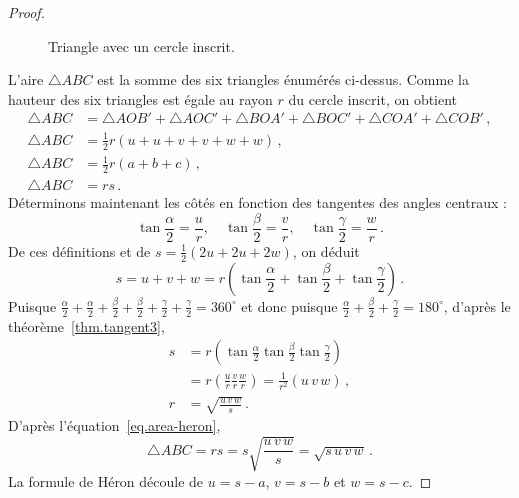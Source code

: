 \begin{proof}
\begin{figure}[ht]

\caption{Triangle avec un cercle inscrit.}\label{f.inscribed}
\end{figure}
L'aire $\triangle ABC$ est la somme des six triangles énumérés ci-dessus. Comme la hauteur des six triangles est égale au rayon $r$ du cercle inscrit, on obtient 
\begin{align}
\triangle ABC&=\triangle AOB'\!+\!\triangle AOC'\!+\!\triangle BOA'\!+\!\triangle BOC'\!+\!\triangle COA'\!+\!\triangle COB'\,,\\
\triangle ABC&=\frac{1}{2}r(u+u+v+v+w+w)\,,\\
\triangle ABC&=\frac{1}{2}r(a+b+c)\,,\\
\triangle ABC&=rs \label{eq.area-heron}\,.
\end{align}
Déterminons maintenant les côtés en fonction des tangentes des angles centraux :
\begin{displaymath}
\tan \frac{\alpha}{2} = \frac{u}{r},\quad
\tan \frac{\beta}{2} = \frac{v}{r},\quad
\tan \frac{\gamma}{2} = \frac{w}{r}\,.
\end{displaymath}
De ces définitions et de $s=\frac{1}{2}(2u+2u+2w)$, on déduit 
\[
s = u+v+w = r\left(\tan \frac{\alpha}{2}+\tan \frac{\beta}{2}+\tan \frac{\gamma}{2}\right)\,.
\]
Puisque $\frac{\alpha}{2}+\frac{\alpha}{2}+\frac{\beta}{2}+\frac{\beta}{2}+\frac{\gamma}{2}+\frac{\gamma}{2}=360^\circ$ et donc puisque $\frac{\alpha}{2}+\frac{\beta}{2}+\frac{\gamma}{2}=180^\circ$, d'après le théorème~\ref{thm.tangent3},
\begin{align*}
s&=r\left(\tan \frac{\alpha}{2}\tan \frac{\beta}{2}\tan \frac{\gamma}{2}\right)\\
&=r\left(\frac{u}{r}\frac{v}{r}\frac{w}{r}\right)=\frac{1}{r^2}(u\,v\,w)\,,\\
r&=\sqrt{\displaystyle\frac{u\,v\,w}{s}}\,.
\end{align*}
D'après l'équation~\ref{eq.area-heron},
\[
\triangle ABC=rs=s\sqrt{\displaystyle\frac{u\,v\,w}{s}}=\sqrt{s\,u\,v\,w}\,.
\]
La formule de Héron découle de $u=s-a$, $v=s-b$ et $w=s-c$.
\end{proof}


